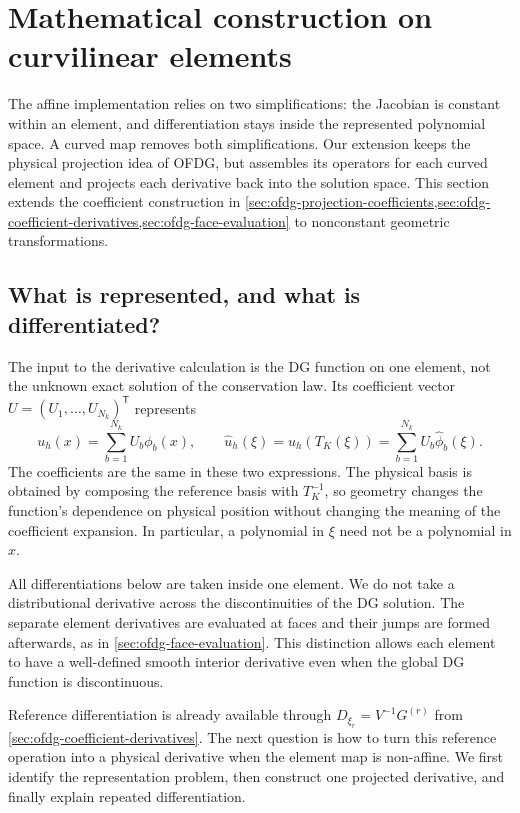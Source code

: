 \section{Mathematical construction on curvilinear elements}
\label{sec:curvilinear-mathematics}
The affine implementation relies on two simplifications: the Jacobian is
constant within an element, and differentiation stays inside the represented
polynomial space. A curved map removes both simplifications. Our extension
keeps the physical projection idea of OFDG, but assembles its operators for
each curved element and projects each derivative back into the solution space.
This section extends the coefficient construction in
\cref{sec:ofdg-projection-coefficients,sec:ofdg-coefficient-derivatives,sec:ofdg-face-evaluation}
to nonconstant geometric transformations.

\subsection{What is represented, and what is differentiated?}
The input to the derivative calculation is the DG function on one element,
not the unknown exact solution of the conservation law. Its coefficient
vector $U=(U_1,\ldots,U_{N_k})^{\mathsf T}$ represents
\begin{equation}
 u_h(x)=\sum_{b=1}^{N_k}U_b\phi_b(x),\qquad
 \widehat u_h(\xi)=u_h(T_K(\xi))
                 =\sum_{b=1}^{N_k}U_b\widehat\phi_b(\xi).
 \label{eq:curved-stored-function}
\end{equation}
The coefficients are the same in these two expressions. The physical basis
is obtained by composing the reference basis with $T_K^{-1}$, so geometry
changes the function's dependence on physical position without changing the
meaning of the coefficient expansion. In particular, a polynomial in $\xi$
need not be a polynomial in $x$.

All differentiations below are taken inside one element. We do not take a
distributional derivative across the discontinuities of the DG solution.
The separate element derivatives are evaluated at faces and their jumps are
formed afterwards, as in \cref{sec:ofdg-face-evaluation}. This distinction
allows each element to have a well-defined smooth interior derivative even
when the global DG function is discontinuous.

Reference differentiation is already available through
$D_{\xi_r}=V^{-1}G^{(r)}$ from
\cref{sec:ofdg-coefficient-derivatives}. The next question is how to turn
this reference operation into a physical derivative when the element map is
non-affine. We first identify the representation problem, then construct
one projected derivative, and finally explain repeated differentiation.

